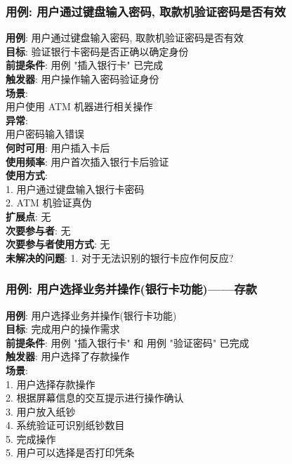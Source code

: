 \documentclass[UTF8]{article}
\begin{document}
\subsubsection{用例: 用户通过键盘输入密码, 取款机验证密码是否有效}
\noindent
\textbf{用例}: 用户通过键盘输入密码, 取款机验证密码是否有效
\\
\textbf{目标}: 验证银行卡密码是否正确以确定身份
\\
\textbf{前提条件}: 用例 "插入银行卡" 已完成
\\
\textbf{触发器}: 用户操作输入密码验证身份
\\
\textbf{场景}: \\
	\hspace*{2em} 用户使用 ATM 机器进行相关操作 \\
\textbf{异常}: \\
	\hspace*{2em} 用户密码输入错误 \\
\textbf{何时可用}: 用户插入卡后
\\
\textbf{使用频率}: 用户首次插入银行卡后验证
\\
\textbf{使用方式}:\\
	\hspace*{2em}1. 用户通过键盘输入银行卡密码 \\
	\hspace*{2em}2. ATM 机验证真伪 \\
\textbf{扩展点}: 无
\\
\textbf{次要参与者}: 无
\\
\textbf{次要参与者使用方式}: 无
\\
\textbf{未解决的问题}: 
	\hspace*{2em}1. 对于无法识别的银行卡应作何反应?
	
\subsubsection{用例: 用户选择业务并操作(银行卡功能)——存款}
\noindent
\textbf{用例}: 用户选择业务并操作(银行卡功能)
\\
\textbf{目标}: 完成用户的操作需求
\\
\textbf{前提条件}: 用例 "插入银行卡" 和 用例 "验证密码" 已完成
\\
\textbf{触发器}: 用户选择了存款操作
\\
\textbf{场景}: \\
	\hspace*{2em}1. 用户选择存款操作 \\
	\hspace*{2em}2. 根据屏幕信息的交互提示进行操作确认 \\
	\hspace*{2em}3. 用户放入纸钞 \\
	\hspace*{2em}4. 系统验证可识别纸钞数目 \\
	\hspace*{2em}5. 完成操作 \\
	\hspace*{2em} 5. 用户可以选择是否打印凭条 \\
	
\end{document}
